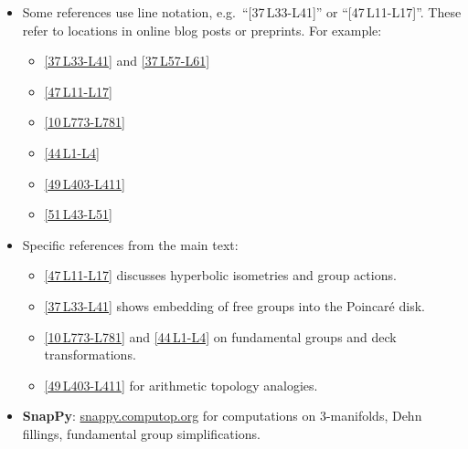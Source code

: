 \documentclass[11pt]{article}
\theoremstyle{remark}
\begin{document}
    \begin{itemize}[leftmargin=1.5em]
        \item \textdagger Some references use line notation, e.g.\ ``[37\,\textdagger L33-L41]'' or ``[47\,\textdagger L11-L17]''. These refer to locations in online blog posts or preprints. For example:
        \begin{itemize}
            \item \href{https://blog.geometryteachersguide.com/visually-representing-infinite-cayley-graphs-in-the-hyperbolic-plane/}{[37\,\textdagger L33-L41]} and \href{https://blog.geometryteachersguide.com/visually-representing-infinite-cayley-graphs-in-the-hyperbolic-plane/}{[37\,\textdagger L57-L61]}
            \item \href{https://arxiv.org/abs/math/0109125}{[47\,\textdagger L11-L17]}
            \item \href{http://homepages.math.uic.edu/~kauffman/KnotGroupAndBFTheory.pdf}{[10\,\textdagger L773-L781]}
            \item \href{https://www.maths.ed.ac.uk/~v1ranick/papers/hatcher.pdf}{[44\,\textdagger L1-L4]}
            \item \href{https://arxiv.org/abs/1010.1881}{[49\,\textdagger L403-L411]}
            \item \href{https://arxiv.org/abs/math/9803087}{[51\,\textdagger L43-L51]}
        \end{itemize}

        \vspace*{0.5em}

        \item Specific references from the main text:
        \begin{itemize}
            \item \href{https://arxiv.org/abs/math/0109125}{[47\,\textdagger L11-L17]} discusses hyperbolic isometries and group actions.
            \item \href{https://blog.geometryteachersguide.com/visually-representing-infinite-cayley-graphs-in-the-hyperbolic-plane/}{[37\,\textdagger L33-L41]} shows embedding of free groups into the Poincar\'e disk.
            \item \href{http://homepages.math.uic.edu/~kauffman/KnotGroupAndBFTheory.pdf}{[10\,\textdagger L773-L781]} and \href{https://www.maths.ed.ac.uk/~v1ranick/papers/hatcher.pdf}{[44\,\textdagger L1-L4]} on fundamental groups and deck transformations.
            \item \href{https://arxiv.org/abs/1010.1881}{[49\,\textdagger L403-L411]} for arithmetic topology analogies.
        \end{itemize}

        \vspace*{0.5em}

        \item \textbf{SnapPy}: \href{https://snappy.computop.org/}{snappy.computop.org} for computations on 3-manifolds, Dehn fillings, fundamental group simplifications.

    \end{itemize}
\end{document}

